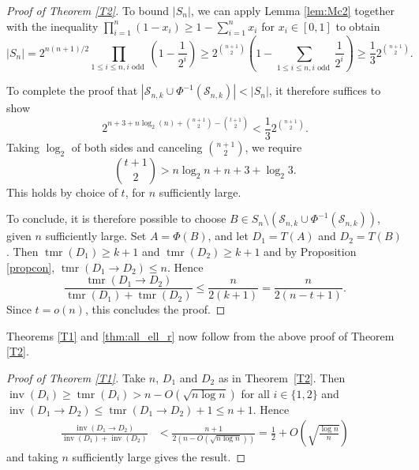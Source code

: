 \documentclass[a4paper, 12pt, reqno]{amsart}
\numberwithin{equation}{section}
\theoremstyle{plain}
\theoremstyle{remark}
\theoremstyle{definition}
\newcommand{\lb}{\left(}
\newcommand{\rb}{\right)}
\newcommand{\tmr}{\operatorname{tmr}}
\newcommand{\inv}{\operatorname{inv}}
\begin{document}
\begin{proof}[Proof of Theorem \ref{T2}]
   To bound $|S_n|$, we can apply Lemma \ref{lem:Mc2} together with the inequality $\prod_{i=1}^n (1-x_i) \geq 1 - \sum_{i=1}^n x_i$ for $x_i \in [0,1]$ to obtain
    \begin{equation*}
         |S_n| = 2^{n(n+1)/2} \prod_{1 \leq i \le n, i \text{ odd  }} \lb1-\frac{1}{2^i}\rb \geq 2^{\binom{n+1}{2}} \lb1 - \sum_{1 \leq i \le n, i \text{ odd  }}\frac{1}{2^i}\rb \geq \frac{1}{3} 2^{\binom{n+1}{2}}.
    \end{equation*}
    
    To complete the proof that $|{\mathcal{S}_{n, k} \cup \Phi^{-1}(\mathcal{S}_{n, k})} | < |S_n|$, it therefore suffices to show
    \begin{equation*}
       2^{n+3 +n\log_2(n) + \binom{n+1}{2}-\binom{t+1}{2}} <  \frac{1}{3} 2^{\binom{n+1}{2}}.
    \end{equation*}
    Taking $\log_2 $ of both sides and canceling $ \binom{n+1}{2}$, we require
    \begin{equation*}
        \binom{t+1}{2} > n\log_2 n + n + 3 + \log_2{3}.
    \end{equation*}
    This holds by choice of $t$, for $n$ sufficiently large.
    
    To conclude, it is therefore possible to choose $B \in S_n \setminus ({\mathcal{S}_{n, k} \cup \Phi^{-1}(\mathcal{S}_{n, k})} )$, given $n$ sufficiently large. Set $A = \Phi(B)$, and let $D_1 = T(A)$ and $D_2 = T(B)$. Then $\tmr(D_1) \geq k+1$ and $\tmr(D_2) \geq k+1$ and by Proposition \ref{propcon}, $\tmr(D_1 \to D_2) \leq n$. Hence 
    \begin{equation*}
        \frac{\tmr(D_1 \to D_2)}{\tmr(D_1) + \tmr( D_2)}  \leq \frac{n}{2(k+1)} = \frac{n}{2(n-t+1)} .
    \end{equation*}
    Since $t = o(n)$, this concludes the proof.
\end{proof}

Theorems \ref{T1} and \ref{thm:all_ell_r} now follow from the above proof of Theorem \ref{T2}.

 \begin{proof}[Proof of Theorem \ref{T1}]
Take $n$, $D_1$ and $D_2$ as in Theorem~\ref{T2}. Then $\inv(D_i) \geq \tmr(D_i) > n-O(\sqrt{n\log{n}})$ for all $i \in \{1,2\}$ and $\inv(D_1 \to D_2) \leq \tmr(D_1 \to D_2) +1 \le n+1$. Hence
\begin{align*}
    \frac{\inv(D_1 \to D_2)}{\inv(D_1) + \inv(D_2)} &<  \frac{n+1}{2\lb n-O(\sqrt{n\log{n}})\rb} 
    = \frac{1}{2} + O\lb\sqrt{\frac{\log{n}}{n}}\rb
\end{align*}
and taking $n$ sufficiently large gives the result.
 \end{proof}
\end{document}

